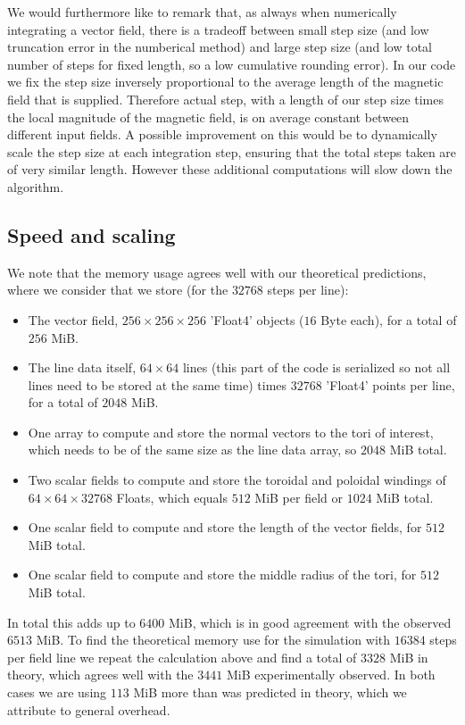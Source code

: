 \documentclass{article}
\begin{document}
We would furthermore like to remark that, as always when numerically integrating a vector field, there is a tradeoff between small step size (and low truncation error in the numberical method) and large step size (and low total number of steps for fixed length, so a low cumulative rounding error). 
In our code we fix the step size inversely proportional to the average length of the magnetic field that is supplied. 
Therefore actual step, with a length of our step size times the local magnitude of the magnetic field, is on average constant between different input fields. 
A possible improvement on this would be to dynamically scale the step size at each integration step, ensuring that the total steps taken are of very similar length. 
However these additional computations will slow down the algorithm.\\

\subsection{Speed and scaling}
We note that the memory usage agrees well with our theoretical predictions, where we consider that we store (for the $32768$ steps per line):
\begin{itemize}
\item The vector field, $256\times256\times256$ 'Float4' objects ($16$ Byte each), for a total of $256$ MiB.
\item The line data itself, $64\times 64$ lines (this part of the code is serialized so not all lines need to be stored at the same time) times $32768$ 'Float4' points per line, for a total of $2048$ MiB.
\item One array to compute and store the normal vectors to the tori of interest, which needs to be of the same size as the line data array, so $2048$ MiB total.
\item Two scalar fields to compute and store the toroidal and poloidal windings of $64\times 64\times 32768$ Floats, which equals $512$ MiB per field or $1024$ MiB total.
\item One scalar field to compute and store the length of the vector fields, for $512$ MiB total.
\item One scalar field to compute and store the middle radius of the tori, for $512$ MiB total.
\end{itemize}
In total this adds up to $6400$ MiB, which is in good agreement with the observed $6513$ MiB. 
To find the theoretical memory use for the simulation with $16384$ steps per field line we repeat the calculation above and find a total of $3328$ MiB in theory, which agrees well with the $3441$ MiB experimentally observed. 
In both cases we are using $113$ MiB more than was predicted in theory, which we attribute to general overhead.\\
\end{document}
